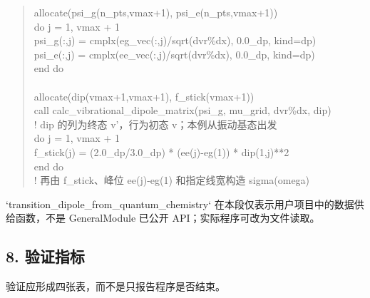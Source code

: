 \documentclass[UTF8,openany,11pt,fontset=fandol]{ctexbook}
\begin{document}
\begin{quote}
allocate(psi\_g(n\_pts,vmax+1), psi\_e(n\_pts,vmax+1))\\
do j = 1, vmax + 1\\
psi\_g(:,j) = cmplx(eg\_vec(:,j)/sqrt(dvr\%dx), 0.0\_dp, kind=dp)\\
psi\_e(:,j) = cmplx(ee\_vec(:,j)/sqrt(dvr\%dx), 0.0\_dp, kind=dp)\\
end do\\
~\\
allocate(dip(vmax+1,vmax+1), f\_stick(vmax+1))\\
call calc\_vibrational\_dipole\_matrix(psi\_g, mu\_grid, dvr\%dx, dip)\\
! dip 的列为终态 v'，行为初态 v；本例从振动基态出发\\
do j = 1, vmax + 1\\
f\_stick(j) = (2.0\_dp/3.0\_dp) * (ee(j)-eg(1)) * dip(1,j)**2\\
end do\\
! 再由 f\_stick、峰位 ee(j)-eg(1) 和指定线宽构造 sigma(omega)
\end{quote}

`transition\_dipole\_from\_quantum\_chemistry`
在本段仅表示用户项目中的数据供给函数，不是 GeneralModule 已公开
API；实际程序可改为文件读取。

\subsection{\texorpdfstring{\textbf{8.
验证指标}}{8. 验证指标}}\label{ux9a8cux8bc1ux6307ux6807}

验证应形成四张表，而不是只报告程序是否结束。
\end{document}
